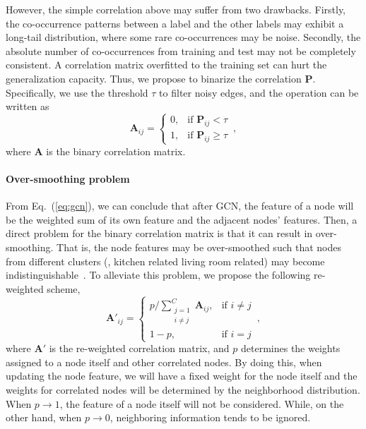 \documentclass[10pt,twocolumn,letterpaper]{article}
\begin{document}
However, the simple correlation above may suffer from two drawbacks. Firstly, the co-occurrence patterns between a label and the other labels may exhibit a long-tail distribution, where some rare co-occurrences may be noise. Secondly, the absolute number of co-occurrences from training and test may not be completely consistent. A correlation matrix overfitted to the training set can hurt the generalization capacity. Thus, we propose to binarize the correlation $\bm{P}$. Specifically, we use the threshold $\tau$ to filter noisy edges, and the operation can be written as
\begin{equation}
\label{eq:binary}
	\bm{A}_{ij} =
\begin{cases} 
0,  & \mbox{if }\bm{P}_{ij} < \tau \\
1, & \mbox{if }\bm{P}_{ij} \geq \tau
\end{cases}\,,
\end{equation}
where $\bm{A}$ is the binary correlation matrix.

\paragraph{Over-smoothing problem} From Eq.~(\ref{eq:gcn}), we can conclude that after GCN, the feature of a node will be the weighted sum of its own feature and the adjacent nodes' features. Then, a direct problem for the binary correlation matrix is that it can result in over-smoothing. That is, the node features may be over-smoothed such that nodes from different clusters (\eg, kitchen related \vs living room related) may become indistinguishable~\cite{oversmooth}. To alleviate this problem, we propose the following re-weighted scheme,
\begin{equation}
\label{eq:reweight}
	\bm{A'}_{ij} = 
\begin{cases} 
p / \sum_{\substack{j=1 \\ i \neq j}}^{C} \bm{A}_{ij},  & \mbox{if }i \neq j \\
1 - p, & \mbox{if }i = j
\end{cases}\,,
\end{equation}
where $\bm{A'}$ is the re-weighted correlation matrix, and $p$ determines the weights assigned to a node itself and other correlated nodes. By doing this, when updating the node feature, we will have a fixed weight for the node itself and the weights for correlated nodes will be determined by the neighborhood distribution. When $p\to 1$, the feature of a node itself will not be considered. While, on the other hand, when $p\to 0$, neighboring information tends to be ignored.
\end{document}
